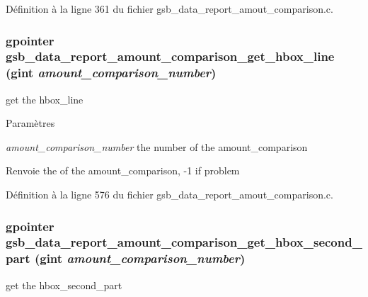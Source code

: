 Définition à la ligne 361 du fichier gsb\_\-data\_\-report\_\-amout\_\-comparison.c.

\subsubsection[{gsb\_\-data\_\-report\_\-amount\_\-comparison\_\-get\_\-hbox\_\-line}]{\setlength{\rightskip}{0pt plus 5cm}gpointer gsb\_\-data\_\-report\_\-amount\_\-comparison\_\-get\_\-hbox\_\-line (gint {\em amount\_\-comparison\_\-number})}\label{gsb__data__report__amout__comparison_8c_a16f1b40f708722b5b69378fe06846b06}
get the hbox\_\-line


\begin{DoxyParams}{Paramètres}
\item[{\em amount\_\-comparison\_\-number}]the number of the amount\_\-comparison\end{DoxyParams}
\begin{DoxyReturn}{Renvoie}
the of the amount\_\-comparison, -\/1 if problem 
\end{DoxyReturn}


Définition à la ligne 576 du fichier gsb\_\-data\_\-report\_\-amout\_\-comparison.c.

\subsubsection[{gsb\_\-data\_\-report\_\-amount\_\-comparison\_\-get\_\-hbox\_\-second\_\-part}]{\setlength{\rightskip}{0pt plus 5cm}gpointer gsb\_\-data\_\-report\_\-amount\_\-comparison\_\-get\_\-hbox\_\-second\_\-part (gint {\em amount\_\-comparison\_\-number})}\label{gsb__data__report__amout__comparison_8c_a820deaa79a40b8b64515c7fd8815c97e}
get the hbox\_\-second\_\-part


